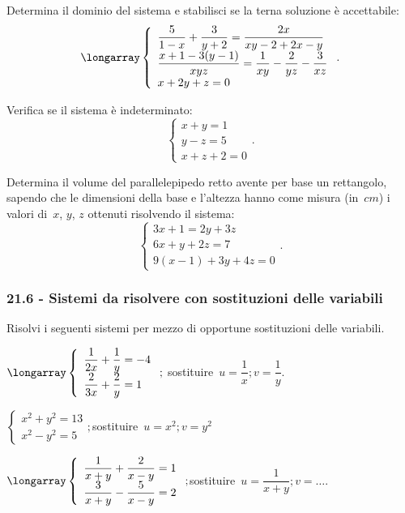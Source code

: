 \begin{esercizio}
 \label{ese:21.63}
Determina il dominio del sistema e stabilisci se la terna soluzione è accettabile:
\[\longarray\left\{\begin{array}{l}\dfrac{5}{1-x}+\dfrac{3}{y+2}=\dfrac{2x}{xy-2+2x-y}\\
\dfrac{x+1-3(y-1)}{xyz}=\dfrac{1}{xy}-\dfrac{2}{yz}-\dfrac{3}{xz}\\
x+2y+z=0\end{array}\right..\]
\end{esercizio}

\begin{esercizio}
 \label{ese:21.64}
Verifica se il sistema è indeterminato:
\[\left\{\begin{array}{l}x+y=1 \\y-z=5
\\x+z+2=0 \end{array}\right..\]
\end{esercizio}

\begin{esercizio}
 \label{ese:21.65}
Determina il volume del parallelepipedo retto avente
per base un rettangolo, sapendo che le dimensioni della base e
l'altezza hanno come misura (in~$\unit{cm}$) i valori
di~$x$, $y$, $z$ ottenuti risolvendo il sistema:
\[\left\{\begin{array}{l}3x+1=2y+3z \\6x+y+2z=7
\\9(x-1)+3y+4z=0 \end{array}\right..\]
\end{esercizio}

\subsubsection*{21.6 - Sistemi da risolvere con sostituzioni delle variabili}

\begin{esercizio}[\Ast]
 \label{ese:21.66}
 Risolvi i seguenti sistemi per mezzo di opportune sostituzioni delle variabili.

\begin{enumeratea}
\item $\longarray\left\{\begin{array}{l}\dfrac{1}{2x}+\dfrac{1}{y}=-4\\\dfrac{2}{3x}+\dfrac{2}{y}=1\end{array}\right.;$ \quad sostituire~$u=\dfrac{1}{x};v=\dfrac{1}{y}$.
\item $\left\{\begin{array}{l}x^{2}+y^{2}=13\\x^{2}-y^{2}=5 \end{array}\right.;$\quad sostituire~$u=x^{2};v=y^{2}$
\item $\longarray\left\{\begin{array}{l}\dfrac{1}{x+y}+\dfrac{2}{x-y}=1\\\dfrac{3}{x+y}-\dfrac{5}{x-y}=2\end{array}\right.;$\quad sostituire~$u=\dfrac{1}{x+y};v=\ldots$.
\end{enumeratea}
\end{esercizio}

